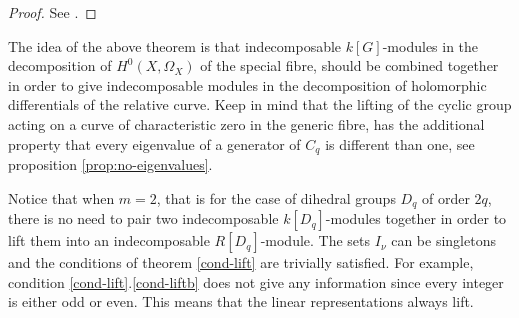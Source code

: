 \documentclass[11pt,letterpaper]{amsart}
\theoremstyle{definition}
\DeclareMathOperator\Gl {GL}
\DeclareMathOperator{\Spe}{Spec}
\renewcommand{\mod}{\bmod}
\begin{document}
\begin{proof}
 See \cite{MR4779377}. 
\end{proof}


The idea of the above theorem is that  indecomposable $k[G]$-modules in the decomposition of $H^0(X,\Omega_X)$ of the special fibre, should be combined together in order to give indecomposable modules in the decomposition of holomorphic differentials of the  relative curve. 
Keep in mind that the lifting of the cyclic group acting on a curve of characteristic zero in the generic fibre, has the additional property that every eigenvalue of a generator of $C_q$ is different than one, see {proposition} \ref{prop:no-eigenvalues}. 




Notice that when $m=2$, that is for the case of dihedral groups $D_q$ of order $2q$, there is no need to pair two indecomposable $k[D_q]$-modules together in order to lift them into an indecomposable $R[D_q]$-module. The sets $I_\nu$ can be singletons and the conditions of theorem \ref{cond-lift} are trivially satisfied. For example, condition \ref{cond-lift}.\ref{cond-liftb} does not give any information since every integer is either odd or even.  This means that the linear representations always lift. 
\end{document}
